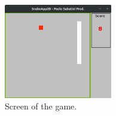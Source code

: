\begin{figure}[b]\centering
\includegraphics[width=0.42\textwidth]{imgs/SnakeScreen.png}
\caption{Screen of the game.}
\label{fig:game_screen}

\end{figure}